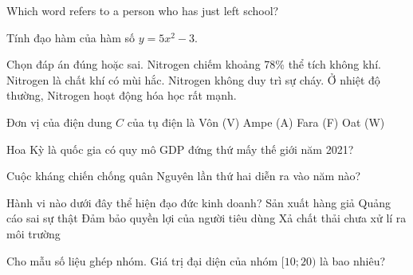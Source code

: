 \begin{ex}
    Which word refers to a person who has just left school?
\end{ex}
\begin{ex}
    Tính đạo hàm của hàm số $y = 5x^2 - 3$.
\end{ex}
\begin{ex}
    Chọn đáp án đúng hoặc sai.
    \choiceTF
    {\True Nitrogen chiếm khoảng 78\% thể tích không khí.}
    {Nitrogen là chất khí có mùi hắc.}
    {\True Nitrogen không duy trì sự cháy.}
    {Ở nhiệt độ thường, Nitrogen hoạt động hóa học rất mạnh.}
\end{ex}
\begin{ex}
    Đơn vị của điện dung $C$ của tụ điện là
    \choice
    {Vôn (V)}
    {Ampe (A)}
    {\True Fara (F)}
    {Oat (W)}
\end{ex}
\begin{ex}
    Hoa Kỳ là quốc gia có quy mô GDP đứng thứ mấy thế giới năm 2021?
\end{ex}
\begin{ex}
    Cuộc kháng chiến chống quân Nguyên lần thứ hai diễn ra vào năm nào?
\end{ex}
\begin{ex}
    Hành vi nào dưới đây thể hiện đạo đức kinh doanh?
    \choice
    {Sản xuất hàng giả}
    {Quảng cáo sai sự thật}
    {\True Đảm bảo quyền lợi của người tiêu dùng}
    {Xả chất thải chưa xử lí ra môi trường}
\end{ex}
\begin{ex}
    Cho mẫu số liệu ghép nhóm. Giá trị đại diện của nhóm $[10; 20)$ là bao nhiêu?
\end{ex}
